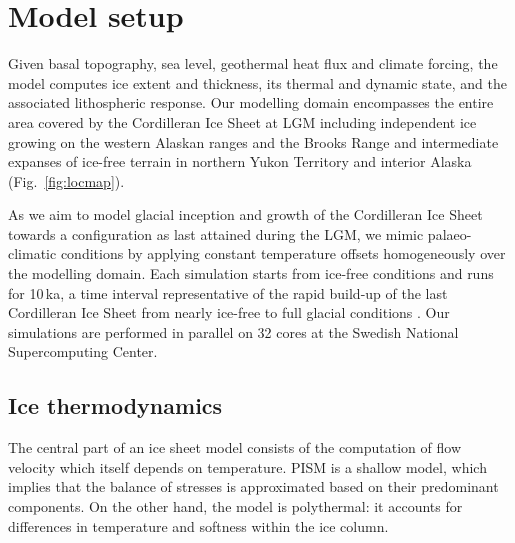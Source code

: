 \section{Model setup}
\label{sec:model}

Given basal topography, sea level, geothermal heat flux and climate forcing, the model computes ice extent and thickness, its thermal and dynamic state, and the associated lithospheric response. Our modelling domain encompasses the entire area covered by the Cordilleran Ice Sheet at LGM including independent ice growing on the western Alaskan ranges and the Brooks Range and intermediate expanses of ice-free terrain in northern Yukon Territory and interior Alaska (Fig.~\ref{fig:locmap}).

As we aim to model glacial inception and growth of the Cordilleran Ice Sheet towards a configuration as last attained during the LGM, we mimic palaeo-climatic conditions by applying constant temperature offsets homogeneously over the modelling domain. Each simulation starts from ice-free conditions and runs for 10\,ka, a time interval representative of the rapid build-up of the last Cordilleran Ice Sheet from nearly ice-free to full glacial conditions \citep{clague-1989,stroeven-etal-2010}. Our simulations are performed in parallel on 32 cores at the Swedish National Supercomputing Center.

\subsection{Ice thermodynamics}

The central part of an ice sheet model consists of the computation of flow velocity which itself depends on temperature. PISM is a shallow model, which implies that the balance of stresses is approximated based on their predominant components. On the other hand, the model is polythermal: it accounts for differences in temperature and softness within the ice column.

